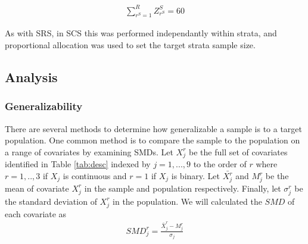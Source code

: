 \documentclass[man,floatsintext]{apa6}
\begin{document}
\begin{align} \label{eq:rankCS}
  \sum_{r^S=1}^R{Z^S_{r^S} = 60}
\end{align}

As with SRS, in SCS this was performed independantly within strata, and proportional allocation was used to set the target strata sample size.

\hypertarget{analysis}{%
\subsection{Analysis}\label{analysis}}

\hypertarget{generalizability}{%
\subsubsection{Generalizability}\label{generalizability}}

There are several methods to determine how generalizable a sample is to a target population. One common method is to compare the sample to the population on a range of covariates by examining SMDs. Let \(X^r_j\) be the full set of covariates identified in Table \ref{tab:desc} indexed by \(j = 1,...,9\) to the order of \(r\) where \(r = 1,..,3\) if \(X_j\) is continuous and \(r = 1\) if \(X_j\) is binary. Let \(\bar{X^r_j}\) and \(M^r_j\) be the mean of covariate \(X^r_j\) in the sample and population respectively. Finally, let \(\sigma^r_j\) be the standard deviation of \(X^r_j\) in the population. We will calculated the \(SMD\) of each covariate as
\begin{align}
  SMD^r_{j} = \frac{\bar{X}^{r}_{j}-M^{r}_{j}}{\sigma_{j}}
\end{align}
\end{document}
